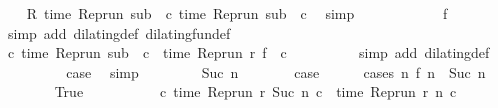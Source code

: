 \begin{isabellebody}
\ {}\ \isamarkupfalse%
\ {\isacartoucheopen}R\ {\isacharparenleft}time\ {\isacharparenleft}{\isacharparenleft}Rep{\isacharunderscore}run\ sub{\isacharparenright}\ {}\ c\ time\ {\isacharparenleft}{\isacharparenleft}Rep{\isacharunderscore}run\ sub{\isacharparenright}\ {}\ c\ \isamarkupfalse%
\ simp\isanewline
\ \ \ \ \ \ \isamarkupfalse%
\ \isamarkupfalse%
\ {\isacharasterisk}\ \isamarkupfalse%
\ {\isacartoucheopen}f\ {}\ {\isacharequal}\ {}{\isacartoucheclose}\ \isamarkupfalse%
\ {\isacharparenleft}simp\ add{\isacharcolon}\ dilating{\isacharunderscore}def\ dilating{\isacharunderscore}fun{\isacharunderscore}def{\isacharparenright}\isanewline
\ \ \ \ \ \ \isamarkupfalse%
\ \isamarkupfalse%
\ {\isacharasterisk}\ \isamarkupfalse%
\ {\isacartoucheopen}{\isasymforall}c{\isachardot}\ time\ {\isacharparenleft}{\isacharparenleft}Rep{\isacharunderscore}run\ sub{\isacharparenright}\ {}\ c{\isacharparenright}\ {\isacharequal}\ time\ {\isacharparenleft}{\isacharparenleft}Rep{\isacharunderscore}run\ r{\isacharparenright}\ {\isacharparenleft}f\ {}{\isacharparenright}\ c{\isacharparenright}{\isacartoucheclose}\isanewline
\ \ \ \ \ \ \ \ \isamarkupfalse%
\ {\isacharparenleft}simp\ add{\isacharcolon}\ dilating{\isacharunderscore}def{\isacharparenright}\isanewline
\ \ \ \ \ \ \isamarkupfalse%
\ \isamarkupfalse%
\ {\isacharquery}case\ \isamarkupfalse%
\ simp\isanewline
\ \ \isamarkupfalse%
\isanewline
\ \ \ \ \isamarkupfalse%
\ {\isacharparenleft}Suc\ n{\isacharparenright}\isanewline
\ \ \ \ \isamarkupfalse%
\ \isamarkupfalse%
\ {\isacharquery}case\isanewline
\ \ \ \ \isamarkupfalse%
\ {\isacharparenleft}cases\ {\isacartoucheopen}{\isasymnexists}n\ f\ n\ {\isacharequal}\ Suc\ n{\isacartoucheclose}{\isacharparenright}\isanewline
\ \ \ \ \ \ \isamarkupfalse%
\ True\isanewline
\ \ \ \ \ \ \isamarkupfalse%
\ {\isacharasterisk}\ \isamarkupfalse%
\ {\isacartoucheopen}{\isasymforall}c{\isachardot}\ time\ {\isacharparenleft}Rep{\isacharunderscore}run\ r\ {\isacharparenleft}Suc\ n{\isacharparenright}\ c{\isacharparenright}\ {\isacharequal}\ time\ {\isacharparenleft}Rep{\isacharunderscore}run\ r\ n\ c{\isacharparenright}{\isacartoucheclose}\isanewline

\end{isabellebody}
